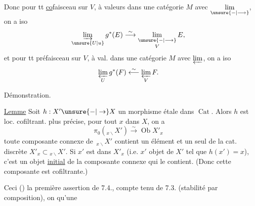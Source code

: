 Donc pour tt \uline{co}faisceau  sur $V$, à valeurs dans
une catégorie $M$ avec $\underset{\unsure{-|\longrightarrow}}{\lim}$, on a iso
\[
\underset{\unsure{U|u}}{\varinjlim}\,g^*(E)\stackrel{\sim}{\longrightarrow}
\underset{V}{\underset{\unsure{-|\longrightarrow}}{\lim}}\,E,
\]
et pour tt préfaisceau  sur $V$, à val. dans une
catégorie $M$ avec $\varprojlim$, on a iso
\[
\underset{U}{\varprojlim}\,g^*(F)\stackrel{\sim}{\longleftarrow}
\underset{V}{\varprojlim}\,F.
\]

Démonstration.  

\uline{Lemme}  Soit $h:X'\unsure{-|\to}X$ un morphisme étale
dans $\operatorname{Cat}$. Alors $h$ est loc. cofiltrant. 
plus précise, pour tout $x$ dans $X$, 
on a
\[
\pi_0({}_{x\backslash}X')\overset{\sim}{\longrightarrow}\operatorname{Ob} X'_x
\]
toute composante connexe de $\,{}_{x\backslash}X'$ contient
un élément et un seul de  la
cat. discrète $X'_x\subset{}_{x\backslash}X'$. Si $x'$ est dans
$X'_x$ (i.e.  $x'$ objet de $X'$ tel que $h(x')=x$),
c'est un objet \uline{initial} de la composante
connexe qui le contient. (Donc cette composante est cofiltrante.)

Ceci   () la première
assertion de 7.4., compte tenu de 7.3.
(stabilité par composition), on  qu'une
